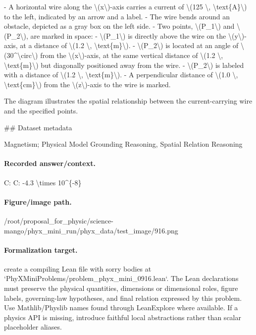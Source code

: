 - A horizontal wire along the \textbackslash{}(x\textbackslash{})-axis carries a current of \textbackslash{}(125 \textbackslash{}, \textbackslash{}text\{A\}\textbackslash{}) to the left, indicated by an arrow and a label.
- The wire bends around an obstacle, depicted as a gray box on the left side.
- Two points, \textbackslash{}(P\_1\textbackslash{}) and \textbackslash{}(P\_2\textbackslash{}), are marked in space:
  - \textbackslash{}(P\_1\textbackslash{}) is directly above the wire on the \textbackslash{}(y\textbackslash{})-axis, at a distance of \textbackslash{}(1.2 \textbackslash{}, \textbackslash{}text\{m\}\textbackslash{}).
  - \textbackslash{}(P\_2\textbackslash{}) is located at an angle of \textbackslash{}(30\textasciicircum{}\textbackslash{}circ\textbackslash{}) from the \textbackslash{}(x\textbackslash{})-axis, at the same vertical distance of \textbackslash{}(1.2 \textbackslash{}, \textbackslash{}text\{m\}\textbackslash{}) but diagonally positioned away from the wire.
- \textbackslash{}(P\_2\textbackslash{}) is labeled with a distance of \textbackslash{}(1.2 \textbackslash{}, \textbackslash{}text\{m\}\textbackslash{}).
- A perpendicular distance of \textbackslash{}(1.0 \textbackslash{}, \textbackslash{}text\{cm\}\textbackslash{}) from the \textbackslash{}(z\textbackslash{})-axis to the wire is marked.

The diagram illustrates the spatial relationship between the current-carrying wire and the specified points.

\#\# Dataset metadata

Magnetism; Physical Model Grounding Reasoning, Spatial Relation Reasoning

\paragraph{Recorded answer/context.}
C: C: -4.3 \textbackslash{}times 10\textasciicircum{}\{-8\}

\paragraph{Figure/image path.}
/root/proposal\_for\_physic/science-mango/phyx\_mini\_run/phyx\_data/test\_image/916.png

\paragraph{Formalization target.}
create a compiling Lean file with sorry bodies at `PhyXMiniProblems/problem\_phyx\_mini\_0916.lean`. The Lean declarations must preserve the physical quantities, dimensions or dimensional roles, figure labels, governing-law hypotheses, and final relation expressed by this problem.
Use Mathlib/Physlib names found through LeanExplore where available. If a physics API is missing, introduce faithful local abstractions rather than scalar placeholder aliases.

